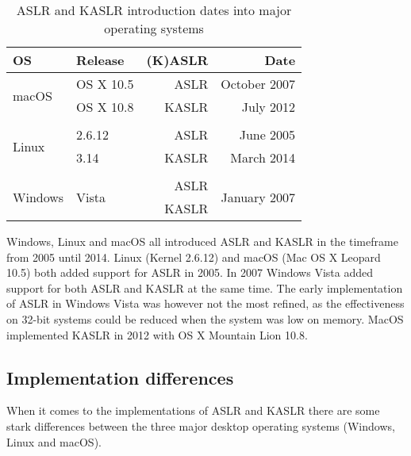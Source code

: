 \begin{table}[!ht]
    \small
    \centering
    \begin{tabular}{llrr}
    \hline
        \textbf{OS} & \textbf{Release} & \textbf{(K)ASLR} & \textbf{Date} \\ \hline
        \multirow{2}{*}{macOS}   & OS X 10.5              &  ASLR & October 2007 \\ 
                                 & OS X 10.8              & KASLR & July 2012    \\ \\
        \multirow{2}{*}{Linux}   & 2.6.12                 &  ASLR & June 2005    \\ 
                                 & 3.14                   & KASLR & March 2014   \\ \\
        \multirow{2}{*}{Windows} & \multirow{2}{*}{Vista} &  ASLR & \multirow{2}{*}{January 2007} \\
                                 &                        & KASLR & \\ \hline
    \end{tabular}
    \caption{ASLR and KASLR introduction dates into major operating systems{\cite[Figure~1]{drk}}}
\end{table}

Windows, Linux and macOS all introduced ASLR and KASLR in the timeframe from 2005 until 2014.
Linux (Kernel 2.6.12) and macOS (Mac OS X Leopard 10.5) both added support for ASLR in 2005.
In 2007 Windows Vista added support for both ASLR and KASLR at the same time. The early implementation of ASLR in Windows Vista was however not the most refined, as the effectiveness on 32-bit systems could be reduced when the system was low on memory.
MacOS implemented KASLR in 2012 with OS X Mountain Lion 10.8.\cite{drk}

\subsection{Implementation differences}

When it comes to the implementations of ASLR and KASLR there are some stark differences between the three major desktop operating systems (Windows, Linux and macOS).

